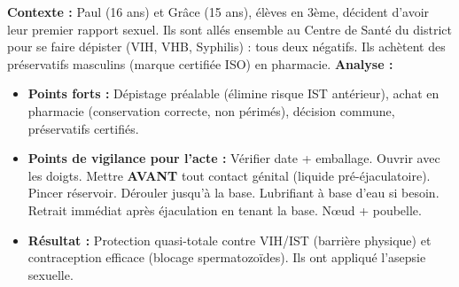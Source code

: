 \documentclass[11pt]{article}
\begin{document}
\begin{exemplebox}
\textbf{Contexte :} Paul (16 ans) et Grâce (15 ans), élèves en 3ème, décident d'avoir leur premier rapport sexuel. Ils sont allés ensemble au Centre de Santé du district pour se faire dépister (VIH, VHB, Syphilis) : tous deux négatifs. Ils achètent des préservatifs masculins (marque certifiée ISO) en pharmacie.
\textbf{Analyse :}
\begin{itemize}
    \item \textbf{Points forts :} Dépistage préalable (élimine risque IST antérieur), achat en pharmacie (conservation correcte, non périmés), décision commune, préservatifs certifiés.
    \item \textbf{Points de vigilance pour l'acte :} Vérifier date + emballage. Ouvrir avec les doigts. Mettre \textbf{AVANT} tout contact génital (liquide pré-éjaculatoire). Pincer réservoir. Dérouler jusqu'à la base. Lubrifiant à base d'eau si besoin. Retrait immédiat après éjaculation en tenant la base. Nœud + poubelle.
    \item \textbf{Résultat :} Protection quasi-totale contre VIH/IST (barrière physique) et contraception efficace (blocage spermatozoïdes). Ils ont appliqué l'asepsie sexuelle.
\end{itemize}
\end{exemplebox}
\end{document}
